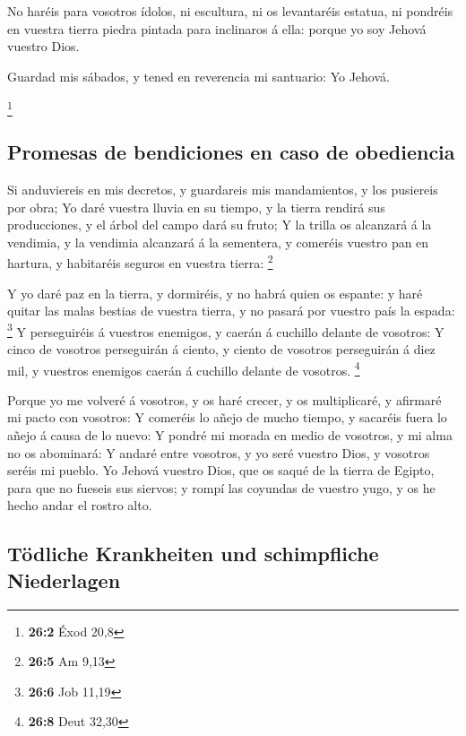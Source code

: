  No haréis para vosotros ídolos, ni escultura, ni os
levantaréis estatua, ni pondréis en vuestra tierra piedra pintada para
inclinaros á ella: porque yo soy Jehová vuestro Dios.

 Guardad mis sábados, y tened en reverencia mi santuario:
Yo Jehová.

\footnote{\textbf{26:2} Éxod 20,8}

\hypertarget{promesas-de-bendiciones-en-caso-de-obediencia}{%
\subsection{Promesas de bendiciones en caso de
obediencia}\label{promesas-de-bendiciones-en-caso-de-obediencia}}

 Si anduviereis en mis decretos, y guardareis mis
mandamientos, y los pusiereis por obra;  Yo daré vuestra
lluvia en su tiempo, y la tierra rendirá sus producciones, y el árbol
del campo dará su fruto;  Y la trilla os alcanzará á la
vendimia, y la vendimia alcanzará á la sementera, y comeréis vuestro pan
en hartura, y habitaréis seguros en vuestra tierra: \footnote{\textbf{26:5}
  Am 9,13}

 Y yo daré paz en la tierra, y dormiréis, y no habrá quien
os espante: y haré quitar las malas bestias de vuestra tierra, y no
pasará por vuestro país la espada: \footnote{\textbf{26:6} Job 11,19}
 Y perseguiréis á vuestros enemigos, y caerán á cuchillo
delante de vosotros:  Y cinco de vosotros perseguirán á
ciento, y ciento de vosotros perseguirán á diez mil, y vuestros enemigos
caerán á cuchillo delante de vosotros. \footnote{\textbf{26:8} Deut
  32,30}

 Porque yo me volveré á vosotros, y os haré crecer, y os
multiplicaré, y afirmaré mi pacto con vosotros:  Y
comeréis lo añejo de mucho tiempo, y sacaréis fuera lo añejo á causa de
lo nuevo:  Y pondré mi morada en medio de vosotros, y mi
alma no os abominará:  Y andaré entre vosotros, y yo seré
vuestro Dios, y vosotros seréis mi pueblo.  Yo Jehová
vuestro Dios, que os saqué de la tierra de Egipto, para que no fueseis
sus siervos; y rompí las coyundas de vuestro yugo, y os he hecho andar
el rostro alto.

\hypertarget{tuxf6dliche-krankheiten-und-schimpfliche-niederlagen}{%
\subsection{Tödliche Krankheiten und schimpfliche
Niederlagen}\label{tuxf6dliche-krankheiten-und-schimpfliche-niederlagen}}

